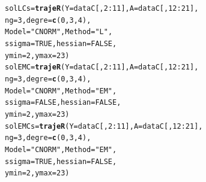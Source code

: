 \documentclass{article}\usepackage[]{graphicx}\usepackage[]{color}
\makeatletter
\newcommand{\hlnum}[1]{\textcolor[rgb]{0.686,0.059,0.569}{#1}}%
\newcommand{\hlstr}[1]{\textcolor[rgb]{0.192,0.494,0.8}{#1}}%
\newcommand{\hlopt}[1]{\textcolor[rgb]{0,0,0}{#1}}%
\newcommand{\hlstd}[1]{\textcolor[rgb]{0.345,0.345,0.345}{#1}}%
\newcommand{\hlkwb}[1]{\textcolor[rgb]{0.69,0.353,0.396}{#1}}%
\newcommand{\hlkwc}[1]{\textcolor[rgb]{0.333,0.667,0.333}{#1}}%
\newcommand{\hlkwd}[1]{\textcolor[rgb]{0.737,0.353,0.396}{\textbf{#1}}}%
\newenvironment{kframe}{%
 \def\at@end@of@kframe{}%
 \ifinner\ifhmode%
  \def\at@end@of@kframe{\end{minipage}}%
  \begin{minipage}{\columnwidth}%
 \fi\fi%
 \def\FrameCommand##1{\hskip\@totalleftmargin \hskip-\fboxsep
 \colorbox{shadecolor}{##1}\hskip-\fboxsep
     \hskip-\linewidth \hskip-\@totalleftmargin \hskip\columnwidth}%
 \MakeFramed {\advance\hsize-\width
   \@totalleftmargin\z@ \linewidth\hsize
   \@setminipage}}%
 {\par\unskip\endMakeFramed%
 \at@end@of@kframe}
\newenvironment{knitrout}{}{} %
\makeatother
\begin{document}
\begin{knitrout}
\color{fgcolor}\begin{kframe}
\begin{alltt}
\hlstd{solLCs} \hlkwb{=} \hlkwd{trajeR}\hlstd{(}\hlkwc{Y} \hlstd{= dataC[,}\hlnum{2}\hlopt{:}\hlnum{11}\hlstd{],} \hlkwc{A} \hlstd{= dataC[,}\hlnum{12}\hlopt{:}\hlnum{21}\hlstd{],}
                \hlkwc{ng} \hlstd{=} \hlnum{3}\hlstd{,} \hlkwc{degre} \hlstd{=} \hlkwd{c}\hlstd{(}\hlnum{0}\hlstd{,}\hlnum{3}\hlstd{,}\hlnum{4}\hlstd{),}
                \hlkwc{Model}\hlstd{=}\hlstr{"CNORM"}\hlstd{,} \hlkwc{Method} \hlstd{=} \hlstr{"L"}\hlstd{,}
                \hlkwc{ssigma} \hlstd{=} \hlnum{TRUE}\hlstd{,} \hlkwc{hessian} \hlstd{=} \hlnum{FALSE}\hlstd{,}
                \hlkwc{ymin} \hlstd{=} \hlnum{2}\hlstd{,}  \hlkwc{ymax} \hlstd{=} \hlnum{23}\hlstd{)}
\hlstd{solEMC} \hlkwb{=} \hlkwd{trajeR}\hlstd{(}\hlkwc{Y} \hlstd{= dataC[,}\hlnum{2}\hlopt{:}\hlnum{11}\hlstd{],} \hlkwc{A} \hlstd{= dataC[,}\hlnum{12}\hlopt{:}\hlnum{21}\hlstd{],}
                \hlkwc{ng} \hlstd{=} \hlnum{3}\hlstd{,} \hlkwc{degre} \hlstd{=} \hlkwd{c}\hlstd{(}\hlnum{0}\hlstd{,}\hlnum{3}\hlstd{,}\hlnum{4}\hlstd{),}
                \hlkwc{Model}\hlstd{=}\hlstr{"CNORM"}\hlstd{,} \hlkwc{Method} \hlstd{=} \hlstr{"EM"}\hlstd{,}
                \hlkwc{ssigma} \hlstd{=} \hlnum{FALSE}\hlstd{,} \hlkwc{hessian} \hlstd{=} \hlnum{FALSE}\hlstd{,}
                \hlkwc{ymin} \hlstd{=} \hlnum{2}\hlstd{,}  \hlkwc{ymax} \hlstd{=} \hlnum{23}\hlstd{)}
\hlstd{solEMCs} \hlkwb{=} \hlkwd{trajeR}\hlstd{(}\hlkwc{Y} \hlstd{= dataC[,}\hlnum{2}\hlopt{:}\hlnum{11}\hlstd{],} \hlkwc{A} \hlstd{= dataC[,}\hlnum{12}\hlopt{:}\hlnum{21}\hlstd{],}
                 \hlkwc{ng} \hlstd{=} \hlnum{3}\hlstd{,} \hlkwc{degre} \hlstd{=} \hlkwd{c}\hlstd{(}\hlnum{0}\hlstd{,}\hlnum{3}\hlstd{,}\hlnum{4}\hlstd{),}
                 \hlkwc{Model}\hlstd{=}\hlstr{"CNORM"}\hlstd{,} \hlkwc{Method} \hlstd{=} \hlstr{"EM"}\hlstd{,}
                 \hlkwc{ssigma} \hlstd{=} \hlnum{TRUE}\hlstd{,} \hlkwc{hessian} \hlstd{=} \hlnum{FALSE}\hlstd{,}
                 \hlkwc{ymin} \hlstd{=} \hlnum{2}\hlstd{,}  \hlkwc{ymax} \hlstd{=} \hlnum{23}\hlstd{)}
\end{alltt}
\end{kframe}
\end{knitrout}
\end{document}

